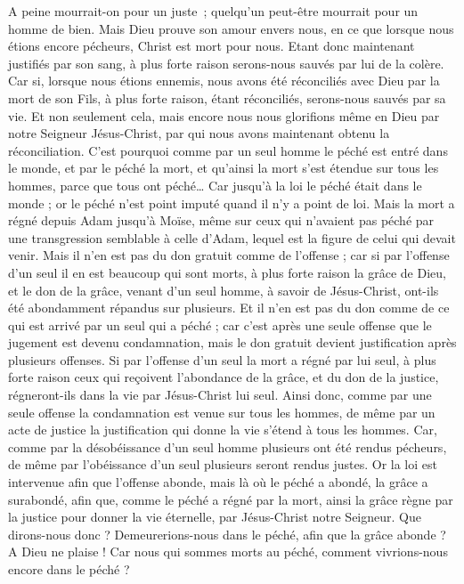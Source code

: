 \begin{multicols}{2}
A peine mourrait-on pour un juste ; quelqu’un peut-être mourrait pour un homme de bien.
Mais Dieu prouve son amour envers nous, en ce que lorsque nous étions encore pécheurs, Christ est mort pour nous.
Etant donc maintenant justifiés par son sang, à plus forte raison serons-nous sauvés par lui de la colère.
Car si, lorsque nous étions ennemis, nous avons été réconciliés avec Dieu par la mort de son Fils, à plus forte raison, étant réconciliés, serons-nous sauvés par sa vie.
Et non seulement cela, mais encore nous nous glorifions même en Dieu par notre Seigneur Jésus-Christ, par qui nous avons maintenant obtenu la réconciliation.
C'est pourquoi comme par un seul homme le péché est entré dans le monde, et par le péché la mort, et qu’ainsi la mort s’est étendue sur tous les hommes, parce que tous ont péché…
Car jusqu'à la loi le péché était dans le monde ; or le péché n'est point imputé quand il n'y a point de loi.
Mais la mort a régné depuis Adam jusqu'à Moïse, même sur ceux qui n'avaient pas péché par une transgression semblable à celle d’Adam, lequel est la figure de celui qui devait venir.
Mais il n'en est pas du don gratuit comme de l'offense ; car si par l'offense d'un seul il en est beaucoup qui sont morts, à plus forte raison la grâce de Dieu, et le don de la grâce, venant d'un seul homme, à savoir de Jésus-Christ, ont-ils été abondamment répandus sur plusieurs.
Et il n'en est pas du don comme de ce qui est arrivé par un seul qui a péché ; car c’est après une seule offense que le jugement est devenu condamnation, mais le don gratuit devient justification après plusieurs offenses.
Si par l'offense d'un seul la mort a régné par lui seul, à plus forte raison ceux qui reçoivent l'abondance de la grâce, et du don de la justice, régneront-ils dans la vie par Jésus-Christ lui seul.
Ainsi donc, comme par une seule offense la condamnation est venue sur tous les hommes, de même par un acte de justice la justification qui donne la vie s’étend à tous les hommes.
Car, comme par la désobéissance d'un seul homme plusieurs ont été rendus pécheurs, de même par l'obéissance d'un seul plusieurs seront rendus justes.
Or la loi est intervenue afin que l'offense abonde, mais là où le péché a abondé, la grâce a surabondé,
afin que, comme le péché a régné par la mort, ainsi la grâce règne par la justice pour donner la vie éternelle, par Jésus-Christ notre Seigneur.
\VerseOne{}Que dirons-nous donc ? Demeurerions-nous dans le péché, afin que la grâce abonde ?
A Dieu ne plaise ! Car nous qui sommes morts au péché, comment vivrions-nous encore dans le péché ?

\end{multicols}
